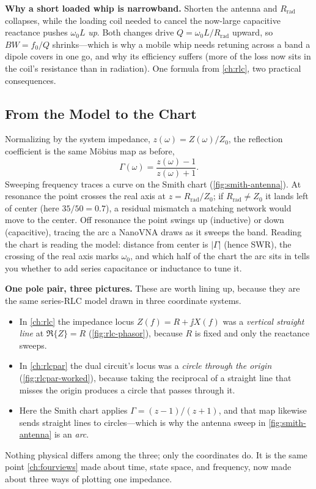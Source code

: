 \begin{physicalbox}
\textbf{Why a short loaded whip is narrowband.} Shorten the antenna and
\(R_{\text{rad}}\) collapses, while the loading coil needed to cancel the now-large
capacitive reactance pushes \(\omega_0L\) \emph{up}. Both changes drive
\(Q=\omega_0L/R_{\text{rad}}\) upward, so \(BW=f_0/Q\) shrinks---which is why a mobile
whip needs retuning across a band a dipole covers in one go, and why its efficiency
suffers (more of the loss now sits in the coil's resistance than in radiation). One
formula from \cref{ch:rlc}, two practical consequences.
\end{physicalbox}

\subsection{From the Model to the Chart}
Normalizing by the system impedance, \(z(\omega)=Z(\omega)/Z_0\), the reflection
coefficient is the same M\"obius map as before,
\[
\Gamma(\omega)=\frac{z(\omega)-1}{z(\omega)+1}.
\]
Sweeping frequency traces a curve on the Smith chart (\cref{fig:smith-antenna}).
At resonance the point crosses the real axis at
\(z=R_{\text{rad}}/Z_0\); if \(R_{\text{rad}}\ne Z_0\) it lands left of center
(here \(35/50=0.7\)), a residual mismatch a matching network would move to the
center. Off resonance the point swings up (inductive) or down (capacitive),
tracing the arc a NanoVNA draws as it sweeps the band. Reading the chart is
reading the model: distance from center is \(|\Gamma|\) (hence SWR), the crossing
of the real axis marks \(\omega_0\), and which half of the chart the arc sits in
tells you whether to add series capacitance or inductance to tune it.

\begin{controlsbox}
\textbf{One pole pair, three pictures.} These are worth lining up, because they are
the same series-RLC model drawn in three coordinate systems.
\begin{itemize}
\item In \cref{ch:rlc} the impedance locus \(Z(f)=R+\jj X(f)\) was a \emph{vertical
straight line} at \(\Re\{Z\}=R\) (\cref{fig:rlc-phasor}), because \(R\) is fixed and
only the reactance sweeps.
\item In \cref{ch:rlcpar} the dual circuit's locus was a \emph{circle through the
origin} (\cref{fig:rlcpar-worked}), because taking the reciprocal of a straight line
that misses the origin produces a circle that passes through it.
\item Here the Smith chart applies \(\Gamma=(z-1)/(z+1)\), and that map likewise
sends straight lines to circles---which is why the antenna sweep in
\cref{fig:smith-antenna} is an \emph{arc}.
\end{itemize}
Nothing physical differs among the three; only the coordinates do. It is the same
point \cref{ch:fourviews} made about time, state space, and frequency, now made about
three ways of plotting one impedance.
\end{controlsbox}

